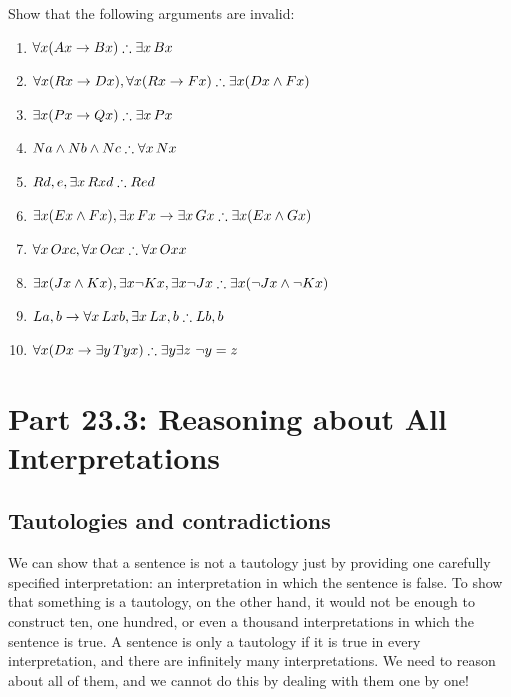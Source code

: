 \problempart
Show that the following arguments are invalid:
\begin{enumerate}
\item $\forall x(\atom{A}{x} \eif \atom{B}{x}) \therefore \exists x\, \atom{B}{x}$
\item $\forall x(\atom{R}{x} \eif \atom{D}{x}), \forall x(\atom{R}{x} \eif \atom{F}{x}) \therefore \exists x(\atom{D}{x} \eand \atom{F}{x})$
\item $\exists x(\atom{P}{x}\eif \atom{Q}{x}) \therefore \exists x\, \atom{P}{x}$
\item $\atom{N}{a} \eand \atom{N}{b} \eand \atom{N}{c} \therefore \forall x\, \atom{N}{x}$
\item $\atom{R}{d,e}, \exists x\, \atom{R}{xd} \therefore \atom{R}{ed}$
\item $\exists x(\atom{E}{x} \eand \atom{F}{x}), \exists x\, \atom{F}{x} \eif \exists x\, \atom{G}{x} \therefore \exists x(\atom{E}{x} \eand \atom{G}{x})$
\item $\forall x\, \atom{O}{xc}, \forall x\, \atom{O}{cx} \therefore \forall x\, \atom{O}{xx}$
\item $\exists x(\atom{J}{x} \eand \atom{K}{x}), \exists x \enot \atom{K}{x}, \exists x \enot \atom{J}{x} \therefore \exists x(\enot \atom{J}{x} \eand \enot \atom{K}{x})$
\item $\atom{L}{a,b} \eif \forall x\, \atom{L}{xb}, \exists x\, \atom{L}{x,b} \therefore \atom{L}{b,b}$
\item $\forall x(\atom{D}{x} \eif \exists y\, \atom{T}{yx}) \therefore \exists y \exists z\ \enot y= z$
\end{enumerate}



\section{Part 23.3: Reasoning about All Interpretations}
\label{allinterp}
\subsection{Tautologies and contradictions}

We can show that a sentence is not a tautology just by providing one carefully specified interpretation: an interpretation in which the sentence is false. To show that something is a tautology, on the other hand, it would not be enough to construct ten, one hundred, or even a thousand interpretations in which the sentence is true. A sentence is only a tautology if it is true in every interpretation, and there are infinitely many interpretations. We need to reason about all of them, and we cannot do this by dealing with them one by one!

